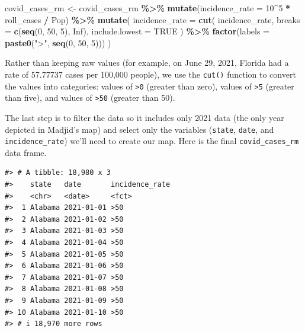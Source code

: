 \documentclass[
]{book}
\newenvironment{Shaded}{\begin{snugshade}}{\end{snugshade}}
\newcommand{\AttributeTok}[1]{\textcolor[rgb]{0.13,0.29,0.53}{#1}}
\newcommand{\ConstantTok}[1]{\textcolor[rgb]{0.56,0.35,0.01}{#1}}
\newcommand{\DecValTok}[1]{\textcolor[rgb]{0.00,0.00,0.81}{#1}}
\newcommand{\FunctionTok}[1]{\textcolor[rgb]{0.13,0.29,0.53}{\textbf{#1}}}
\newcommand{\NormalTok}[1]{#1}
\newcommand{\OtherTok}[1]{\textcolor[rgb]{0.56,0.35,0.01}{#1}}
\newcommand{\SpecialCharTok}[1]{\textcolor[rgb]{0.81,0.36,0.00}{\textbf{#1}}}
\newcommand{\StringTok}[1]{\textcolor[rgb]{0.31,0.60,0.02}{#1}}
\begin{document}
\begin{Shaded}
\begin{Highlighting}[]
\NormalTok{covid\_cases\_rm }\OtherTok{\textless{}{-}}\NormalTok{ covid\_cases\_rm }\SpecialCharTok{\%\textgreater{}\%}
  \FunctionTok{mutate}\NormalTok{(}\AttributeTok{incidence\_rate =} \DecValTok{10}\SpecialCharTok{\^{}}\DecValTok{5} \SpecialCharTok{*}\NormalTok{ roll\_cases }\SpecialCharTok{/}\NormalTok{ Pop) }\SpecialCharTok{\%\textgreater{}\%}
  \FunctionTok{mutate}\NormalTok{(}
    \AttributeTok{incidence\_rate =} \FunctionTok{cut}\NormalTok{(}
\NormalTok{      incidence\_rate,}
      \AttributeTok{breaks =} \FunctionTok{c}\NormalTok{(}\FunctionTok{seq}\NormalTok{(}\DecValTok{0}\NormalTok{, }\DecValTok{50}\NormalTok{, }\DecValTok{5}\NormalTok{), }\ConstantTok{Inf}\NormalTok{),}
      \AttributeTok{include.lowest =} \ConstantTok{TRUE}
\NormalTok{    ) }\SpecialCharTok{\%\textgreater{}\%}
      \FunctionTok{factor}\NormalTok{(}\AttributeTok{labels =} \FunctionTok{paste0}\NormalTok{(}\StringTok{"\textgreater{}"}\NormalTok{, }\FunctionTok{seq}\NormalTok{(}\DecValTok{0}\NormalTok{, }\DecValTok{50}\NormalTok{, }\DecValTok{5}\NormalTok{)))}
\NormalTok{  )}
\end{Highlighting}
\end{Shaded}

Rather than keeping raw values (for example, on June 29, 2021, Florida had a rate of 57.77737 cases per 100,000 people), we use the \texttt{cut()} function to convert the values into categories: values of \texttt{\textgreater{}0} (greater than zero), values of \texttt{\textgreater{}5} (greater than five), and values of \texttt{\textgreater{}50} (greater than 50).

The last step is to filter the data so it includes only 2021 data (the only year depicted in Madjid's map) and select only the variables (\texttt{state}, \texttt{date}, and \texttt{incidence\_rate}) we'll need to create our map. Here is the final \texttt{covid\_cases\_rm} data frame.

\begin{verbatim}
#> # A tibble: 18,980 x 3
#>    state   date       incidence_rate
#>    <chr>   <date>     <fct>         
#>  1 Alabama 2021-01-01 >50           
#>  2 Alabama 2021-01-02 >50           
#>  3 Alabama 2021-01-03 >50           
#>  4 Alabama 2021-01-04 >50           
#>  5 Alabama 2021-01-05 >50           
#>  6 Alabama 2021-01-06 >50           
#>  7 Alabama 2021-01-07 >50           
#>  8 Alabama 2021-01-08 >50           
#>  9 Alabama 2021-01-09 >50           
#> 10 Alabama 2021-01-10 >50           
#> # i 18,970 more rows
\end{verbatim}
\end{document}
